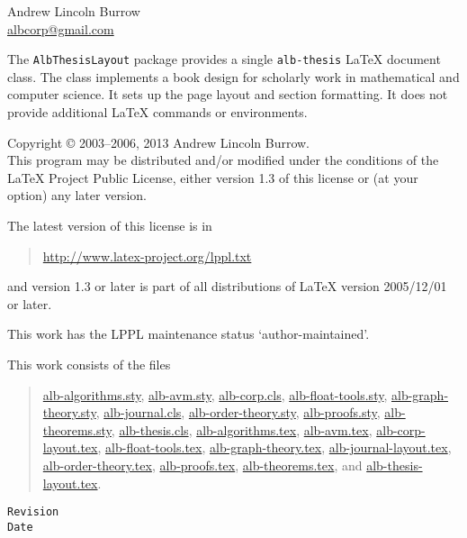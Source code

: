 \documentclass[11pt,a4paper,oneside,titlepage]{alb-corp}
\begin{document}


\begin{albTitlePage}


  Andrew Lincoln Burrow\\
  \url{albcorp@gmail.com}



  The \texttt{AlbThesisLayout} package provides a single
  \texttt{alb-thesis} \LaTeX{} document class.  The class implements a
  book design for scholarly work in mathematical and computer science.
  It sets up the page layout and section formatting.  It does not
  provide additional \LaTeX{} commands or environments.



  Copyright \copyright{} 2003--2006, 2013 Andrew Lincoln Burrow.\\
  This program may be distributed and/or modified under the conditions
  of the \LaTeX{} Project Public License, either version 1.3 of this
  license or (at your option) any later version.

  \medskip{}

  The latest version of this license is in
  \begin{quote}
    \url{http://www.latex-project.org/lppl.txt}
  \end{quote}
  and version 1.3 or later is part of all distributions of LaTeX version
  2005/12/01 or later.

  \medskip{}

  This work has the LPPL maintenance status `author-maintained'.

  \medskip{}

  This work consists of the files
  \begin{quote}
    \begin{flushleft}
      \url{alb-algorithms.sty}, \url{alb-avm.sty}, \url{alb-corp.cls},
      \url{alb-float-tools.sty}, \url{alb-graph-theory.sty},
      \url{alb-journal.cls}, \url{alb-order-theory.sty},
      \url{alb-proofs.sty}, \url{alb-theorems.sty},
      \url{alb-thesis.cls}, \url{alb-algorithms.tex}, \url{alb-avm.tex},
      \url{alb-corp-layout.tex}, \url{alb-float-tools.tex},
      \url{alb-graph-theory.tex}, \url{alb-journal-layout.tex},
      \url{alb-order-theory.tex}, \url{alb-proofs.tex},
      \url{alb-theorems.tex}, and \url{alb-thesis-layout.tex}.
    \end{flushleft}
  \end{quote}



  \verb$Revision$\\
  \verb$Date$

\end{albTitlePage}
\end{document}
